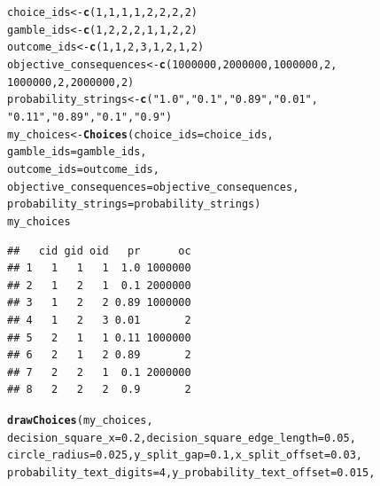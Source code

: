 \documentclass{article}\usepackage[]{graphicx}\usepackage[]{color}
\makeatletter
\newcommand{\hlnum}[1]{\textcolor[rgb]{0.686,0.059,0.569}{#1}}%
\newcommand{\hlstr}[1]{\textcolor[rgb]{0.192,0.494,0.8}{#1}}%
\newcommand{\hlstd}[1]{\textcolor[rgb]{0.345,0.345,0.345}{#1}}%
\newcommand{\hlkwb}[1]{\textcolor[rgb]{0.69,0.353,0.396}{#1}}%
\newcommand{\hlkwc}[1]{\textcolor[rgb]{0.333,0.667,0.333}{#1}}%
\newcommand{\hlkwd}[1]{\textcolor[rgb]{0.737,0.353,0.396}{\textbf{#1}}}%
\newenvironment{kframe}{%
 \def\at@end@of@kframe{}%
 \ifinner\ifhmode%
  \def\at@end@of@kframe{\end{minipage}}%
  \begin{minipage}{\columnwidth}%
 \fi\fi%
 \def\FrameCommand##1{\hskip\@totalleftmargin \hskip-\fboxsep
 \colorbox{shadecolor}{##1}\hskip-\fboxsep
     \hskip-\linewidth \hskip-\@totalleftmargin \hskip\columnwidth}%
 \MakeFramed {\advance\hsize-\width
   \@totalleftmargin\z@ \linewidth\hsize
   \@setminipage}}%
 {\par\unskip\endMakeFramed%
 \at@end@of@kframe}
\newenvironment{knitrout}{}{} %
\makeatother
\begin{document}
\begin{knitrout}
\color{fgcolor}\begin{kframe}
\begin{alltt}
\hlstd{choice_ids} \hlkwb{<-} \hlkwd{c}\hlstd{(}\hlnum{1}\hlstd{,} \hlnum{1}\hlstd{,} \hlnum{1}\hlstd{,} \hlnum{1}\hlstd{,} \hlnum{2}\hlstd{,} \hlnum{2}\hlstd{,} \hlnum{2}\hlstd{,} \hlnum{2}\hlstd{)}
\hlstd{gamble_ids} \hlkwb{<-} \hlkwd{c}\hlstd{(}\hlnum{1}\hlstd{,} \hlnum{2}\hlstd{,} \hlnum{2}\hlstd{,} \hlnum{2}\hlstd{,} \hlnum{1}\hlstd{,} \hlnum{1}\hlstd{,} \hlnum{2}\hlstd{,} \hlnum{2}\hlstd{)}
\hlstd{outcome_ids} \hlkwb{<-} \hlkwd{c}\hlstd{(}\hlnum{1}\hlstd{,} \hlnum{1}\hlstd{,} \hlnum{2}\hlstd{,} \hlnum{3}\hlstd{,} \hlnum{1}\hlstd{,} \hlnum{2}\hlstd{,} \hlnum{1}\hlstd{,} \hlnum{2}\hlstd{)}
\hlstd{objective_consequences} \hlkwb{<-} \hlkwd{c}\hlstd{(}\hlnum{1000000}\hlstd{,} \hlnum{2000000}\hlstd{,} \hlnum{1000000}\hlstd{,} \hlnum{2}\hlstd{,}
        \hlnum{1000000}\hlstd{,} \hlnum{2}\hlstd{,} \hlnum{2000000}\hlstd{,} \hlnum{2}\hlstd{)}
\hlstd{probability_strings} \hlkwb{<-} \hlkwd{c}\hlstd{(}\hlstr{"1.0"}\hlstd{,} \hlstr{"0.1"}\hlstd{,} \hlstr{"0.89"}\hlstd{,} \hlstr{"0.01"}\hlstd{,}
        \hlstr{"0.11"}\hlstd{,} \hlstr{"0.89"}\hlstd{,} \hlstr{"0.1"}\hlstd{,} \hlstr{"0.9"}\hlstd{)}
\hlstd{my_choices} \hlkwb{<-} \hlkwd{Choices}\hlstd{(}\hlkwc{choice_ids}\hlstd{=choice_ids,}
        \hlkwc{gamble_ids}\hlstd{=gamble_ids,}
        \hlkwc{outcome_ids}\hlstd{=outcome_ids,}
        \hlkwc{objective_consequences}\hlstd{=objective_consequences,}
        \hlkwc{probability_strings}\hlstd{=probability_strings)}
\hlstd{my_choices}
\end{alltt}
\begin{verbatim}
##   cid gid oid   pr      oc
## 1   1   1   1  1.0 1000000
## 2   1   2   1  0.1 2000000
## 3   1   2   2 0.89 1000000
## 4   1   2   3 0.01       2
## 5   2   1   1 0.11 1000000
## 6   2   1   2 0.89       2
## 7   2   2   1  0.1 2000000
## 8   2   2   2  0.9       2
\end{verbatim}
\begin{alltt}
\hlkwd{drawChoices}\hlstd{(my_choices,}
        \hlkwc{decision_square_x}\hlstd{=}\hlnum{0.2}\hlstd{,} \hlkwc{decision_square_edge_length}\hlstd{=}\hlnum{0.05}\hlstd{,}
        \hlkwc{circle_radius}\hlstd{=}\hlnum{0.025}\hlstd{,} \hlkwc{y_split_gap}\hlstd{=}\hlnum{0.1}\hlstd{,} \hlkwc{x_split_offset}\hlstd{=}\hlnum{0.03}\hlstd{,}
        \hlkwc{probability_text_digits}\hlstd{=}\hlnum{4}\hlstd{,} \hlkwc{y_probability_text_offset}\hlstd{=}\hlnum{0.015}\hlstd{,}

\end{alltt}
\end{kframe}
\end{knitrout}
\end{document}
